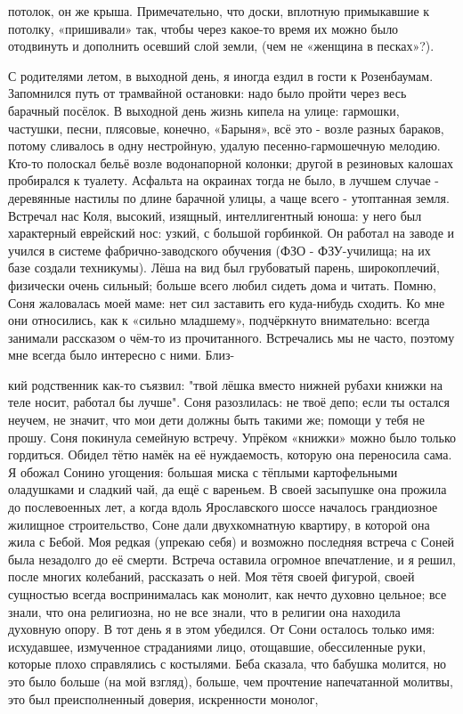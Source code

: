 \label{31-1}
потолок, он же крыша. Примечательно, что доски, вплотную примыкавшие к потолку, «пришивали» так, чтобы через какое-то время их можно было отодвинуть и дополнить осевший слой земли, (чем не «женщина в песках»?).

\label{31-2}
С родителями летом, в выходной день, я иногда ездил в гости к Розенбаумам. Запомнился путь от трамвайной остановки: надо было пройти через весь барачный посёлок. В выходной день жизнь кипела на улице: гармошки, частушки, песни, плясовые, конечно, «Барыня», всё это - возле разных бараков, потому сливалось в одну нестройную, удалую песенно-гармошечную мелодию. Кто-то полоскал бельё возле водонапорной колонки; другой в резиновых калошах пробирался к туалету. Асфальта на окраинах тогда не было, в лучшем случае - деревянные настилы по длине барачной улицы, а чаще всего - утоптанная земля. Встречал нас Коля, высокий, изящный, интеллигентный юноша: у него был характерный еврейский нос: узкий, с большой горбинкой. Он работал на заводе и учился в системе фабрично-заводского обучения (ФЗО - ФЗУ-училища; на их базе создали техникумы). Лёша на вид был грубоватый парень, широкоплечий, физически очень сильный; больше всего любил сидеть дома и читать. Помню, Соня жаловалась моей маме: нет сил заставить его куда-нибудь сходить. Ко мне они относились, как к «сильно младшему», подчёркнуто внимательно: всегда занимали рассказом о чём-то из прочитанного. Встречались мы не часто, поэтому мне всегда было интересно с ними. Близ-

\label{32-1}
кий родственник как-то съязвил: "твой лёшка вместо нижней рубахи книжки на теле носит, работал бы лучше". Соня разозлилась: не твоё депо; если ты остался неучем, не значит, что мои дети должны быть такими же; помощи у тебя не прошу. Соня покинула семейную встречу. Упрёком «книжки» можно было только гордиться. Обидел тётю намёк на её нуждаемость, которую она переносила сама. Я обожал Сонино угощения: большая миска с тёплыми картофельными оладушками и сладкий чай, да ещё с вареньем. В своей засыпушке она прожила до послевоенных лет, а когда вдоль Ярославского шоссе началось грандиозное жилищное строительство, Соне дали двухкомнатную квартиру, в которой она жила с Бебой. Моя редкая (упрекаю себя) и возможно последняя встреча с Соней была незадолго до её смерти. Встреча оставила огромное впечатление, и я решил, после многих колебаний, рассказать о ней. Моя тётя своей фигурой, своей сущностью всегда воспринималась как монолит, как нечто духовно цельное; все знали, что она религиозна, но не все знали, что в религии она находила духовную опору. В тот день я в этом убедился. От Сони осталось только имя: исхудавшее, измученное страданиями лицо, отощавшие, обессиленные руки, которые плохо справлялись с костылями. Беба сказала, что бабушка молится, но это было больше (на мой взгляд), больше, чем прочтение напечатанной молитвы, это был преисполненный доверия, 
искренности монолог,

